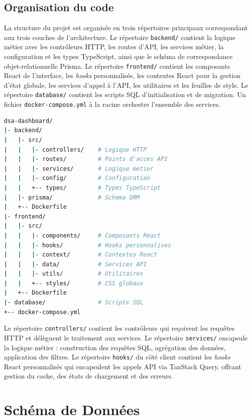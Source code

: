 \documentclass[10pt,twocolumn,a4paper]{article}
\begin{document}
\subsection{Organisation du code}

La structure du projet est organisée en trois répertoires principaux correspondant aux trois couches de l'architecture. Le répertoire \texttt{backend/} contient la logique métier avec les contrôleurs HTTP, les routes d'API, les services métier, la configuration et les types TypeScript, ainsi que le schéma de correspondance objet-relationnelle Prisma. Le répertoire \texttt{frontend/} contient les composants React de l'interface, les \textit{hooks} personnalisés, les contextes React pour la gestion d'état globale, les services d'appel à l'API, les utilitaires et les feuilles de style. Le répertoire \texttt{database/} contient les scripts SQL d'initialisation et de migration. Un fichier \texttt{docker-compose.yml} à la racine orchestre l'ensemble des services.

\begin{lstlisting}[language=bash, caption={Structure du projet TBC MANU}]
dsa-dashboard/
|- backend/
|   |- src/
|   |   |- controllers/    # Logique HTTP
|   |   |- routes/         # Points d'acces API
|   |   |- services/       # Logique metier
|   |   |- config/         # Configuration
|   |   +-- types/         # Types TypeScript
|   |- prisma/             # Schema ORM
|   +-- Dockerfile
|- frontend/
|   |- src/
|   |   |- components/     # Composants React
|   |   |- hooks/          # Hooks personnalises
|   |   |- context/        # Contextes React
|   |   |- data/           # Services API
|   |   |- utils/          # Utilitaires
|   |   +-- styles/        # CSS globaux
|   +-- Dockerfile
|- database/               # Scripts SQL
+-- docker-compose.yml
\end{lstlisting}

Le répertoire \texttt{controllers/} contient les contrôleurs qui reçoivent les requêtes HTTP et délèguent le traitement aux services. Le répertoire \texttt{services/} encapsule la logique métier : construction des requêtes SQL, agrégation des données, application des filtres. Le répertoire \texttt{hooks/} du côté client contient les \textit{hooks} React personnalisés qui encapsulent les appels API via TanStack Query, offrant gestion du cache, des états de chargement et des erreurs.


\section{Schéma de Données}
\end{document}
